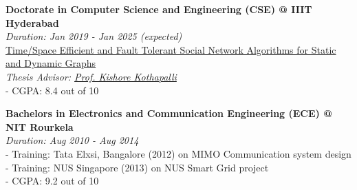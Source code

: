 \textbf{Doctorate in Computer Science and Engineering (CSE) @ IIIT Hyderabad} \\
\emph{Duration: Jan 2019 - Jan 2025 (expected)} \\
\href{https://puzzlef.github.io}{Time/Space Efficient and Fault Tolerant Social Network Algorithms for Static and Dynamic Graphs} \\
\emph{Thesis Advisor: \href{https://faculty.iiit.ac.in/~kkishore/}{Prof. Kishore Kothapalli}} \\
- CGPA: 8.4 out of 10

\noindent
\textbf{Bachelors in Electronics and Communication Engineering (ECE) @ NIT Rourkela} \\
\emph{Duration: Aug 2010 - Aug 2014} \\
- Training: Tata Elxsi, Bangalore (2012) on MIMO Communication system design \\
- Training: NUS Singapore (2013) on NUS Smart Grid project \\
- CGPA: 9.2 out of 10
